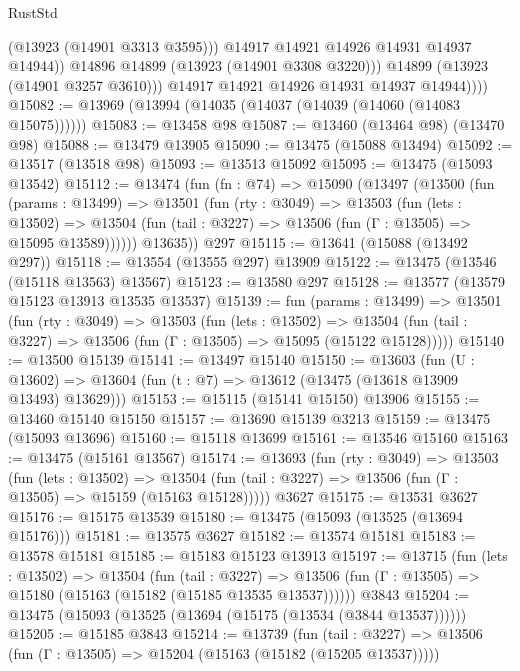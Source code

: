 \begin{lexlean}{RustStd}
\begin{coremodule}
                      (@13923 (@14901 @3313 @3595)))
                    @14917
                    @14921
                    @14926
                    @14931
                    @14937
                    @14944))
                @14896
                @14899
                (@13923 (@14901 @3308 @3220)))
              @14899
              (@13923 (@14901 @3257 @3610)))
            @14917
            @14921
            @14926
            @14931
            @14937
            @14944))))
@15082 := @13969 (@13994 (@14035 (@14037 (@14039 (@14060 (@14083 @15075))))))
@15083 := @13458 @98
@15087 := @13460 (@13464 @98) (@13470 @98)
@15088 := @13479 @13905
@15090 := @13475 (@15088 @13494)
@15092 := @13517 (@13518 @98)
@15093 := @13513 @15092
@15095 := @13475 (@15093 @13542)
@15112 := @13474
    (fun (fn : @74) =>
    @15090
      (@13497
        (@13500
          (fun (params : @13499) =>
          @13501
            (fun (rty : @3049) =>
            @13503
              (fun (lets : @13502) =>
              @13504 (fun (tail : @3227) => @13506 (fun (Γ : @13505) => @15095 @13589))))))
        @13635))
    @297
@15115 := @13641 (@15088 (@13492 @297))
@15118 := @13554 (@13555 @297) @13909
@15122 := @13475 (@13546 (@15118 @13563) @13567)
@15123 := @13580 @297
@15128 := @13577 (@13579 @15123 @13913 @13535 @13537)
@15139 := fun (params : @13499) =>
  @13501
    (fun (rty : @3049) =>
    @13503
      (fun (lets : @13502) =>
      @13504 (fun (tail : @3227) => @13506 (fun (Γ : @13505) => @15095 (@15122 @15128)))))
@15140 := @13500 @15139
@15141 := @13497 @15140
@15150 := @13603
    (fun (U : @13602) => @13604 (fun (t : @7) => @13612 (@13475 (@13618 @13909 @13493) @13629)))
@15153 := @15115 (@15141 @15150) @13906
@15155 := @13460 @15140 @15150
@15157 := @13690 @15139 @3213
@15159 := @13475 (@15093 @13696)
@15160 := @15118 @13699
@15161 := @13546 @15160
@15163 := @13475 (@15161 @13567)
@15174 := @13693
    (fun (rty : @3049) =>
    @13503
      (fun (lets : @13502) =>
      @13504 (fun (tail : @3227) => @13506 (fun (Γ : @13505) => @15159 (@15163 @15128)))))
    @3627
@15175 := @13531 @3627
@15176 := @15175 @13539
@15180 := @13475 (@15093 (@13525 (@13694 @15176)))
@15181 := @13575 @3627
@15182 := @13574 @15181
@15183 := @13578 @15181
@15185 := @15183 @15123 @13913
@15197 := @13715
    (fun (lets : @13502) =>
    @13504
      (fun (tail : @3227) =>
      @13506 (fun (Γ : @13505) => @15180 (@15163 (@15182 (@15185 @13535 @13537))))))
    @3843
@15204 := @13475 (@15093 (@13525 (@13694 (@15175 (@13534 (@3844 @13537))))))
@15205 := @15185 @3843
@15214 := @13739
    (fun (tail : @3227) => @13506 (fun (Γ : @13505) => @15204 (@15163 (@15182 (@15205 @13537)))))

\end{coremodule}
\end{lexlean}
